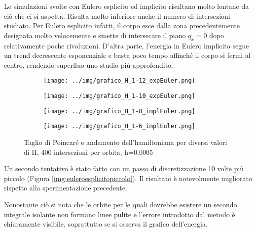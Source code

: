 \documentclass[a4paper, 12pt]{article}
\numberwithin{equation}{section}
\numberwithin{figure}{section}
\begin{document}
Le simulazioni svolte con Eulero esplicito ed implicito risultano molto lontane da ciò che ci
si aspetta. Risulta molto inferiore anche il numero di intersezioni studiato.
Per Eulero esplicito infatti, il corpo esce dalla zona precedentemente designata molto velocemente
e smette di intersecare il piano $q_x=0$ dopo relativamente poche rivoluzioni. D'altra parte,
l'energia in Eulero implicito segue un trend decrescente esponenziale e basta poco tempo affinché
il corpo si fermi al centro, rendendo superfluo uno studio più approfondito.
\begin{figure}[h!]
	\centering
	\begin{subfigure}[t]{.49\textwidth}
		\centering
		\texttt{[image: ../img/grafico\_H\_1-12\_expEuler.png]}
	\end{subfigure}
	\begin{subfigure}[t]{.49\textwidth}
		\centering
		\texttt{[image: ../img/grafico\_H\_1-10\_expEuler.png]}
	\end{subfigure}
	\begin{subfigure}[t]{.49\textwidth}
		\centering
		\texttt{[image: ../img/grafico\_H\_1-8\_implEuler.png]}
	\end{subfigure}
	\begin{subfigure}[t]{.49\textwidth}
		\centering
		\texttt{[image: ../img/grafico\_H\_1-6\_implEuler.png]}
	\end{subfigure}

	\caption{Taglio di Poincaré e andamento dell'hamiltoniana per diversi valori di H,
	400 intersezioni per orbita, h=0.0005}
\end{figure}

Un secondo tentativo è stato fatto con un passo di discretizzazione 10 volte più piccolo
(Figura \ref{img:euleroesplicitopiccolo}). Il risultato è notevolmente migliorato rispetto
alla sperimentazione precedente.

Nonostante ciò si nota che le orbite per le quali dovrebbe esistere un secondo integrale
isolante non formano linee pulite e l'errore introdotto dal metodo è chiaramente visibile,
soprattutto se si osserva il grafico dell'energia.
\end{document}

